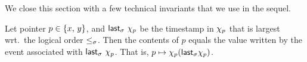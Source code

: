 
  




We close this section with a few technical invariants that we use in
the sequel.


\begin{invariant}\label{inv:last-key}%
Let pointer $p \in \{x,\, y\}$, and $\mathsf{last}_\sigma\ \chi_p$
be the timestamp in $\chi_p$ that is largest wrt.~the logical order
$\mathrel{\leq_\sigma}$. Then the contents of $p$ equals the value written by the
event associated with $\mathsf{last}_\sigma\ \chi_p$. That is, $p
\mapsto \chi_p (\mathsf{last}_\sigma \chi_p)$.
\end{invariant}

